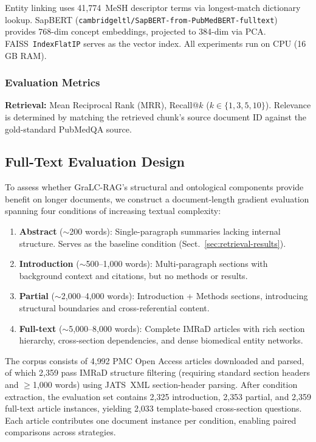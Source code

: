 \documentclass[sn-basic]{sn-jnl}
\newcommand{\gralcrag}{GraLC-RAG}
\begin{document}
Entity linking uses 41,774~MeSH descriptor terms via longest-match dictionary lookup. SapBERT (\texttt{cambridgeltl/SapBERT-from-PubMedBERT-fulltext}) provides 768-dim concept embeddings, projected to 384-dim via PCA. FAISS~\texttt{IndexFlatIP} serves as the vector index. All experiments run on CPU (16\,GB RAM).

\subsubsection{Evaluation Metrics}\label{sec:metrics}

\textbf{Retrieval:} Mean Reciprocal Rank (MRR), Recall@$k$ ($k \!\in\! \{1,3,5,10\}$). Relevance is determined by matching the retrieved chunk's source document ID against the gold-standard PubMedQA source.

\subsection{Full-Text Evaluation Design}\label{sec:fulltext-design}

To assess whether \gralcrag{}'s structural and ontological components provide benefit on longer documents, we construct a document-length gradient evaluation spanning four conditions of increasing textual complexity:

\begin{enumerate}
  \item \textbf{Abstract} (${\sim}$200 words): Single-paragraph summaries lacking internal structure. Serves as the baseline condition (Sect.~\ref{sec:retrieval-results}).
  \item \textbf{Introduction} (${\sim}$500--1{,}000 words): Multi-paragraph sections with background context and citations, but no methods or results.
  \item \textbf{Partial} (${\sim}$2{,}000--4{,}000 words): Introduction + Methods sections, introducing structural boundaries and cross-referential content.
  \item \textbf{Full-text} (${\sim}$5{,}000--8{,}000 words): Complete IMRaD articles with rich section hierarchy, cross-section dependencies, and dense biomedical entity networks.
\end{enumerate}

The corpus consists of 4{,}992 PMC Open Access articles downloaded and parsed, of which 2{,}359 pass IMRaD structure filtering (requiring standard section headers and $\geq$1{,}000 words) using JATS~XML section-header parsing. After condition extraction, the evaluation set contains 2{,}325 introduction, 2{,}353 partial, and 2{,}359 full-text article instances, yielding 2{,}033 template-based cross-section questions. Each article contributes one document instance per condition, enabling paired comparisons across strategies.
\end{document}
